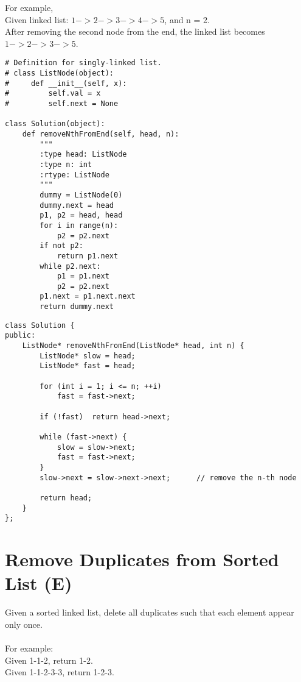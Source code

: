 For example,\\
   Given linked list: $1->2->3->4->5$, and n = 2.\\
   After removing the second node from the end, the linked list becomes $1->2->3->5$.\\

\begin{lstlisting}
# Definition for singly-linked list.
# class ListNode(object):
#     def __init__(self, x):
#         self.val = x
#         self.next = None

class Solution(object):
    def removeNthFromEnd(self, head, n):
        """
        :type head: ListNode
        :type n: int
        :rtype: ListNode
        """
        dummy = ListNode(0)
        dummy.next = head
        p1, p2 = head, head
        for i in range(n):
            p2 = p2.next
        if not p2: 
            return p1.next
        while p2.next:
            p1 = p1.next
            p2 = p2.next
        p1.next = p1.next.next
        return dummy.next
\end{lstlisting}        

\begin{lstlisting}
class Solution {
public:
    ListNode* removeNthFromEnd(ListNode* head, int n) {
        ListNode* slow = head;
        ListNode* fast = head;
        
        for (int i = 1; i <= n; ++i)
            fast = fast->next;
            
        if (!fast)  return head->next;
        
        while (fast->next) {
            slow = slow->next;
            fast = fast->next;
        }
        slow->next = slow->next->next;      // remove the n-th node
        
        return head;
    }
};
\end{lstlisting}


\section{Remove Duplicates from Sorted List (E)}

Given a sorted linked list, delete all duplicates such that each element appear only once.\\ \\
For example: \\
Given 1-1-2, return 1-2. \\
Given 1-1-2-3-3, return 1-2-3. \\

